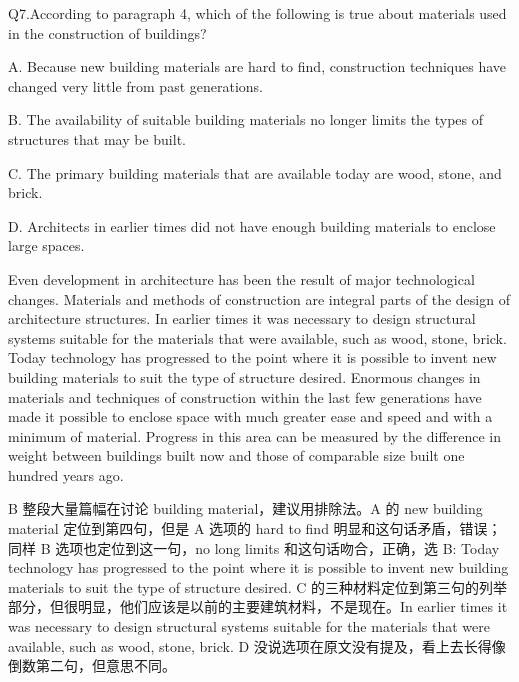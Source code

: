 \begin{blk}
    \begin{qst}
        Q7.According to paragraph 4, which of the following is true about materials used in the construction of buildings?
    \end{qst}

    \begin{chc}
        A. Because new building materials are hard to find, construction techniques have changed very little from past generations.

        B. The availability of suitable building materials no longer limits the types of structures that may be built.

        C. The primary building materials that are available today are wood, stone, and brick.

        D. Architects in earlier times did not have enough building materials to enclose large spaces.
    \end{chc}

    \begin{psgq}
        Even development in architecture has been the result of major technological changes. Materials and methods of construction are integral parts of the design of architecture structures. In earlier times it was necessary to design structural systems suitable for the materials that were available, such as wood, stone, brick. Today technology has progressed to the point where it is possible to invent new building materials to suit the type of structure desired. Enormous changes in materials and techniques of construction within the last few generations have made it possible to enclose space with much greater ease and speed and with a minimum of material. Progress in this area can be measured by the difference in weight between buildings built now and those of comparable size built one hundred years ago.
    \end{psgq}

    \begin{nlz}
        B 整段大量篇幅在讨论 building material，建议用排除法。A 的 new building material 定位到第四句，但是 A 选项的 hard to find 明显和这句话矛盾，错误；同样 B 选项也定位到这一句，no long limits 和这句话吻合，正确，选 B: Today technology has progressed to the point where it is possible to invent new building materials to suit the type of structure desired. C 的三种材料定位到第三句的列举部分，但很明显，他们应该是以前的主要建筑材料，不是现在。In earlier times it was necessary to design structural systems suitable for the materials that were available, such as wood, stone, brick. D 没说选项在原文没有提及，看上去长得像倒数第二句，但意思不同。
    \end{nlz}
\end{blk}

